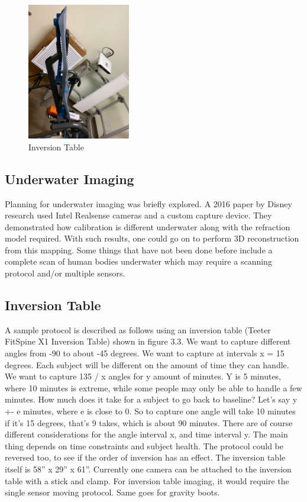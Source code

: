 \begin{figure}[!htb]
	\caption{Inversion Table}
	\centering
	\includegraphics[width=0.4\textwidth]{images/inversion.jpg}
\end{figure}
\subsection{Underwater Imaging}
Planning for underwater imaging was briefly explored. A 2016 paper by Disney research \cite{digumarti2016underwater} used Intel Realsense cameras and a custom capture device. They demonstrated how calibration is different underwater along with the refraction model required. With such results, one could go on to perform 3D reconstruction from this mapping. Some things that have not been done before include a complete scan of human bodies underwater which may require a scanning protocol and/or multiple sensors.
\subsection{Inversion Table}
A sample protocol is described as follows using an inversion table (Teeter FitSpine X1 Inversion Table) shown in figure 3.3. We want to capture different angles from -90 to about -45 degrees. We want to capture at intervals x = 15 degrees. Each subject will be different on the amount of time they can handle. We want to capture 135 / x angles for y amount of minutes. Y is 5 minutes, where 10 minutes is extreme, while some people may only be able to handle a few minutes. How much does it take for a subject to go back to baseline? Let’s say y +- e minutes, where e is close to 0. So to capture one angle will take 10 minutes if it’s 15 degrees, that’s 9 takes, which is about 90 minutes. There are of course different considerations for the angle interval x, and time interval y. The main thing depends on time constraints and subject health. The protocol could be reversed too, to see if the order of inversion has an effect. The inversion table itself is 58” x 29” x 61”. Currently one camera can be attached to the inversion table with a stick and clamp. For inversion table imaging, it would require the single sensor moving protocol. Same goes for gravity boots. 

